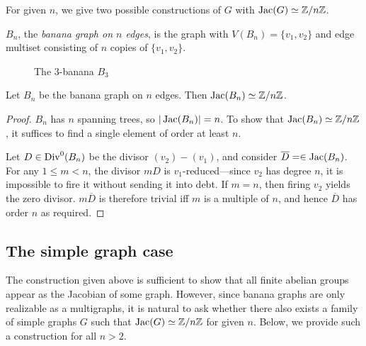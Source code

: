 \documentclass{amsart}
\begin{document}
For given $n$, we give two possible constructions of $G$ with $\operatorname{Jac}(G)
\simeq \mathbb{Z}/n\mathbb{Z}$.

\begin{defn}
  $B_n$, the \emph{banana graph on $n$ edges}, is the graph with
  $V(B_n) = \{v_1, v_2\}$ and edge multiset consisting of $n$ copies of
  $\{v_1, v_2\}$.
\end{defn}

\begin{figure}[h]
  \begin{center}
    \caption{The $3$-banana $B_3$}
  \end{center}
\end{figure}

\begin{prop}
  \label{prop:banana_cyclic}
  Let $B_n$ be the banana graph on $n$ edges. Then $\operatorname{Jac}(B_n) \simeq \mathbb{Z}/n\mathbb{Z}$.
\end{prop}

\begin{proof}
  $B_n$ has $n$ spanning trees, so
  $|\operatorname{Jac}(B_n)| = n$. To show that $\operatorname{Jac}(B_n) \simeq \mathbb{Z}/n\mathbb{Z}$, it
  suffices to find a single element of order at least $n$.

  Let $D \in \operatorname{Div}^0(B_n)$ be the divisor $(v_2) - (v_1)$, and consider
  $\overline{D} = \in \operatorname{Jac}(B_n)$. For any $1 \le m < n$, the divisor
  $mD$ is $v_1$-reduced---since $v_2$ has degree $n$, it is impossible
  to fire it without sending it into debt. If $m=n$, then firing $v_2$
  yields the zero divisor. $m\overline{D}$ is therefore trivial iff
  $m$ is a multiple of $n$, and hence $\overline{D}$ has order $n$ as
  required.
\end{proof}

\subsection{The simple graph case}
The construction given above is sufficient to show that all finite
abelian groups appear as the Jacobian of some graph. However, since
banana graphs are only realizable as a multigraphs, it is natural to
ask whether there also exists a family of simple graphs $G$ such that
$\operatorname{Jac}(G) \simeq \mathbb{Z}/n\mathbb{Z}$ for given $n$. Below, we provide such a
construction for all $n > 2$. 
\end{document}
